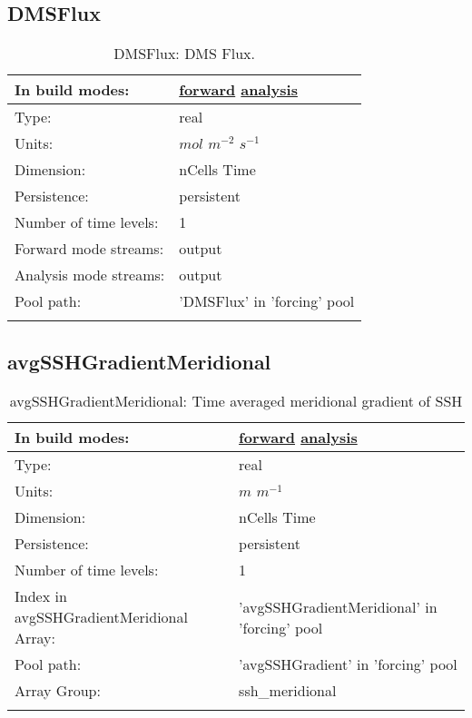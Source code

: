\subsection[DMSFlux]{DMSFlux}
\label{subsec:var_sec_forcing_DMSFlux}
\begin{center}
\begin{longtable}{| p{2.0in} | p{4.0in} |}
        \hline 
        In build modes: & \hyperref[subsec:forward_var_tab_forcing]{forward} \hyperref[subsec:analysis_var_tab_forcing]{analysis} \\
        \hline 
        Type: & real \\
        \hline 
        Units: & $mol$ $m^{-2}$ $s^{-1}$ \\
        \hline 
        Dimension: & nCells Time \\
        \hline 
        Persistence: & persistent \\
        \hline 
        Number of time levels: & 1 \\
        \hline 
		 Forward mode streams: &  output \\
        \hline 
		 Analysis mode streams: &  output \\
        \hline 
            Pool path: & 'DMSFlux' in 'forcing' pool
 \\
		 \hline 
    \caption{DMSFlux: DMS Flux.}
\end{longtable}
\end{center}
\subsection[avgSSHGradientMeridional]{avgSSHGradientMeridional}
\label{subsec:var_sec_forcing_avgSSHGradientMeridional}
\begin{center}
\begin{longtable}{| p{2.0in} | p{4.0in} |}
        \hline 
        In build modes: & \hyperref[subsec:forward_var_tab_forcing]{forward} \hyperref[subsec:analysis_var_tab_forcing]{analysis} \\
        \hline 
        Type: & real \\
        \hline 
        Units: & $m$ $m^{-1}$ \\
        \hline 
        Dimension: & nCells Time \\
        \hline 
        Persistence: & persistent \\
        \hline 
        Number of time levels: & 1 \\
        \hline 
		 Index in avgSSHGradientMeridional Array: & 'avgSSHGradientMeridional' in 'forcing' pool \\
		 \hline 
            Pool path: & 'avgSSHGradient' in 'forcing' pool
 \\
		 \hline 
		 Array Group: & ssh\_meridional \\
		 \hline 
    \caption{avgSSHGradientMeridional: Time averaged meridional gradient of SSH}
\end{longtable}
\end{center}
